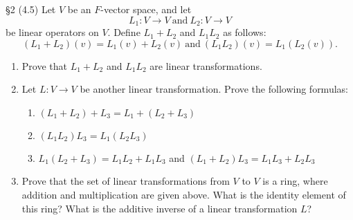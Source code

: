 \documentclass{homework}
\begin{document}
\begin{problem}{\S 2}
  (4.5) Let $V$ be an $F$-vector space, and let \[
    L_1:V\longrightarrow V ~\text{and}~ L_2:V\longrightarrow V
  \] be linear operators on $V$. Define $L_1+L_2$ and $L_1L_2$ as follows: \[
    (L_1+L_2)(v)=L_1(v)+L_2(v) ~\text{and}~ (L_1L_2)(v)=L_1(L_2(v))
  .\]
  \begin{enumerate}[label=(\alph*)]
    \item Prove that $L_1+L_2$ and $L_1L_2$ are linear transformations.
    \item Let $L:V\to V$ be another linear transformation. Prove the following formulas:
      \begin{enumerate}[label=(\alph*)]
        \item $(L_1+L_2)+L_3=L_1+(L_2+L_3)$
        \item $(L_1L_2)L_3=L_1(L_2L_3)$
        \item $L_1(L_2+L_3)=L_1L_2+L_1L_3$ and $(L_1+L_2)L_3=L_1L_3+L_2L_3$
      \end{enumerate}
    \item Prove that the set of linear transformations from $V$ to $V$ is a ring, where addition and
      multiplication are given above. What is the identity element of this ring? What is the
      additive inverse of a linear transformation $L$?
  \end{enumerate}
\end{problem}
\end{document}
